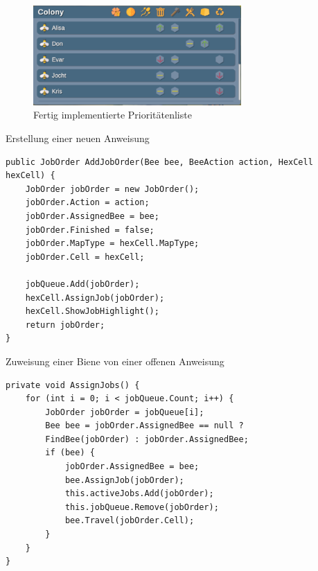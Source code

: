 \begin{figure}
    \begin{center}
        \includegraphics[width=300px]{0.bilder/prioritylist.png}
    \end{center}
    \caption{Fertig implementierte Prioritätenliste} \label{image:prioritylist}
\end{figure}

\begin{listing}[H]
\caption{Erstellung einer neuen Anweisung}
\label{code:addjoborder}
\begin{verbatim}
public JobOrder AddJobOrder(Bee bee, BeeAction action, HexCell hexCell) {
    JobOrder jobOrder = new JobOrder();
    jobOrder.Action = action;
    jobOrder.AssignedBee = bee;
    jobOrder.Finished = false;
    jobOrder.MapType = hexCell.MapType;
    jobOrder.Cell = hexCell;
    
    jobQueue.Add(jobOrder);
    hexCell.AssignJob(jobOrder);
    hexCell.ShowJobHighlight();
    return jobOrder;
}
\end{verbatim}
\end{listing}

\begin{listing}[H]
\caption{Zuweisung einer Biene von einer offenen Anweisung}
\label{code:assignjobs}
\begin{verbatim}
private void AssignJobs() {
    for (int i = 0; i < jobQueue.Count; i++) {
        JobOrder jobOrder = jobQueue[i];
        Bee bee = jobOrder.AssignedBee == null ? 
        FindBee(jobOrder) : jobOrder.AssignedBee;
        if (bee) {
            jobOrder.AssignedBee = bee;
            bee.AssignJob(jobOrder);
            this.activeJobs.Add(jobOrder);
            this.jobQueue.Remove(jobOrder);
            bee.Travel(jobOrder.Cell);
        }
    }
}
\end{verbatim}
\end{listing}

